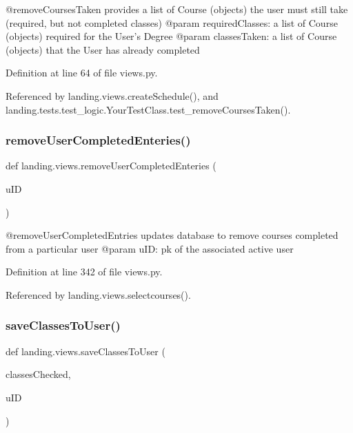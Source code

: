 \begin{DoxyVerb}@removeCoursesTaken provides a list of Course (objects) the user must still take (required, but not completed classes)
@param requiredClasses: a list of Course (objects) required for the User's Degree
@param classesTaken: a list of Course (objects) that the User has already completed
\end{DoxyVerb}
 

Definition at line 64 of file views.\+py.



Referenced by landing.\+views.\+create\+Schedule(), and landing.\+tests.\+test\+\_\+logic.\+Your\+Test\+Class.\+test\+\_\+remove\+Courses\+Taken().

\mbox{\label{namespacelanding_1_1views_a15788f148f992f964f914e41cca3563a}} 
\subsubsection{\texorpdfstring{remove\+User\+Completed\+Enteries()}{removeUserCompletedEnteries()}}
{\footnotesize\ttfamily def landing.\+views.\+remove\+User\+Completed\+Enteries (\begin{DoxyParamCaption}\item[{}]{u\+ID }\end{DoxyParamCaption})}

\begin{DoxyVerb}@removeUserCompletedEntries updates database to remove courses completed from a particular user
@param uID: pk of the associated active user
\end{DoxyVerb}
 

Definition at line 342 of file views.\+py.



Referenced by landing.\+views.\+selectcourses().

\mbox{\label{namespacelanding_1_1views_a474931c0129efca17c6aa8ba314af9e5}} 
\subsubsection{\texorpdfstring{save\+Classes\+To\+User()}{saveClassesToUser()}}
{\footnotesize\ttfamily def landing.\+views.\+save\+Classes\+To\+User (\begin{DoxyParamCaption}\item[{}]{classes\+Checked,  }\item[{}]{u\+ID }\end{DoxyParamCaption})}


